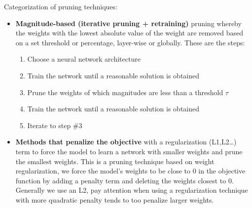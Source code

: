 Categorization of pruning techniques:
\begin{itemize}
    \item \textbf{Magnitude-based (iterative pruning + retraining)} pruning whereby the weights with the lowest absolute value of 
        the weight are removed based on a set threshold or percentage, layer-wise or globally.
        These are the steps:
        \begin{enumerate}
            \item Choose a neural network architecture
            \item Train the network until a reasonable solution is obtained
            \item Prune the weights of which magnitudes are less than a threshold $\tau$
            \item Train the network until a reasonable solution is obtained
            \item Iterate to step \#3
        \end{enumerate}
    \item \textbf{Methods that penalize the objective} with a regularization (L1,L2\dots) term to force the 
        model to learn a network with smaller weights and prune the smallest weights. 
        This is a pruning technique based on weight regularization, we force the 
        model's weights to be close to 0 in the objective function by adding a penalty
        term and deleting the weights closest to 0. Generally we use an L2, pay attention
        when using a regularization technique with more quadratic penalty tends to 
        too penalize larger weights.
    

\end{itemize}
